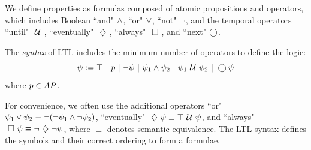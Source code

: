 \documentclass{ifacconf}
\begin{document}
 We define properties as formulas composed of atomic propositions and operators, which includes 
 Boolean ``and" $\wedge$, ``or" $\vee$, ``not" $\neg$, and the temporal operators ``until" $\ \mathcal{U}\ $, ``eventually" $\ \diamondsuit\ $, ``always" $\ \square\ $, and ``next" $\bigcirc$.
    \begin{definition}
    \label{def:gdtl-syntax}
    The {\em syntax} of LTL includes the minimum number of operators to define the logic:
    \begin{equation*}
     \psi :=  \True \ |\ p \ |\ \notltl \psi \ |\ \psi_1 \andltl \psi_2 \ |\ \psi_1 \Until \psi_2 \ |\ \Next \psi
    \end{equation*} 
    where $p\in {AP}$.  
    \end{definition}
    For convenience, we often use the additional operators 
    ``or"  $\psi_1 \vee \psi_2 \equiv  \neg (\neg \psi_1 \wedge \neg \psi_2)$, ``eventually"
    $\ \diamondsuit\  \psi \equiv \top \ \mathcal{U}\  \psi$, and
   ``always"  $\ \square\  \psi \equiv \neg \ \diamondsuit\  \neg \psi$,
    where $\equiv$ denotes semantic equivalence. 
 The LTL syntax defines the symbols and their correct ordering to form a formulae. %
%    
\end{document}
